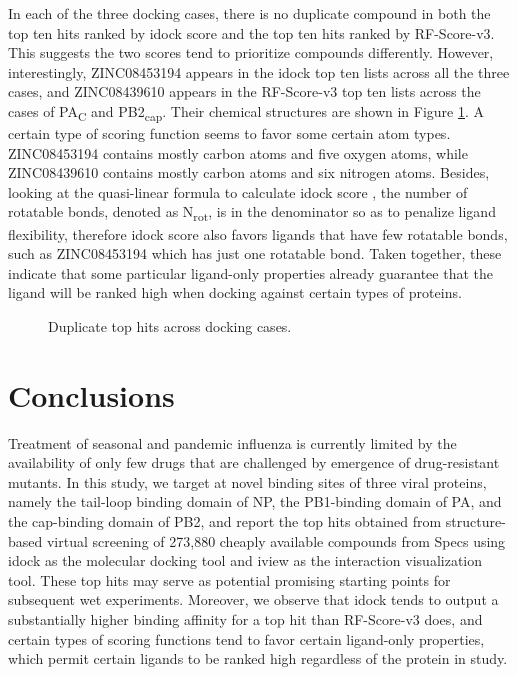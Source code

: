 In each of the three docking cases, there is no duplicate compound in both the top ten hits ranked by idock score and the top ten hits ranked by RF-Score-v3. This suggests the two scores tend to prioritize compounds differently. However, interestingly, ZINC08453194 appears in the idock top ten lists across all the three cases, and ZINC08439610 appears in the RF-Score-v3 top ten lists across the cases of PA\textsubscript{C} and PB2\textsubscript{cap}. Their chemical structures are shown in Figure \ref{influenza:duplicates}. A certain type of scoring function seems to favor some certain atom types. ZINC08453194 contains mostly carbon atoms and five oxygen atoms, while ZINC08439610 contains mostly carbon atoms and six nitrogen atoms. Besides, looking at the quasi-linear formula to calculate idock score \citep{595,1153,1362}, the number of rotatable bonds, denoted as N\textsubscript{rot}, is in the denominator so as to penalize ligand flexibility, therefore idock score also favors ligands that have few rotatable bonds, such as ZINC08453194 which has just one rotatable bond. Taken together, these indicate that some particular ligand-only properties already guarantee that the ligand will be ranked high when docking against certain types of proteins.

\begin{figure}
\centering
{}
\caption{Duplicate top hits across docking cases.}
\label{influenza:duplicates}
\end{figure}

\section{Conclusions}

Treatment of seasonal and pandemic influenza is currently limited by the availability of only few drugs that are challenged by emergence of drug-resistant mutants. In this study, we target at novel binding sites of three viral proteins, namely the tail-loop binding domain of NP, the PB1-binding domain of PA, and the cap-binding domain of PB2, and report the top hits obtained from structure-based virtual screening of 273,880 cheaply available compounds from Specs using idock \citep{1153,1362} as the molecular docking tool and iview \citep{1366} as the interaction visualization tool. These top hits may serve as potential promising starting points for subsequent wet experiments. Moreover, we observe that idock tends to output a substantially higher binding affinity for a top hit than RF-Score-v3 does, and certain types of scoring functions tend to favor certain ligand-only properties, which permit certain ligands to be ranked high regardless of the protein in study.

